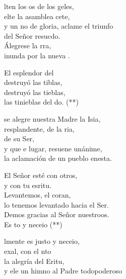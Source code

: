 \begin{cancion}%
	lten los os de los geles,\\
	elte la asamblea cete,\\
	y un no de gloria, aclame el triunfo\\
	del Señor resucdo.\\
	Álegrese la rra,\\
	inunda por la nueva .\\
	\begin{chorus}%
	El esplendor del \\
	destruyó las tiblas,\\
	destruyó las tieblas,\\
	las tinieblas del do. (**)\\
	\end{chorus}%
	 se alegre nuestra Madre la Isia,\\
	resplandente, de la ria,\\
	de su Ser,\\
	y que e lugar, resuene unánime,\\
	la aclamación de un pueblo enesta.\\
	\begin{chorus}%
	El Señor esté con otros,\\
	y con tu esritu.\\
	Levantemos, el coran,\\
	lo tenemos levantado hacia el Ser.\\
	Demos gracias al Señor nuestroos.\\
	Es to y neceio (**)\\
	\end{chorus}%
	lmente es justo y neceio,\\
	exal, con el nto \\
	la alegría del Eritu, \\
	y ele un himno al Padre todopoderoso\\

\end{cancion}
